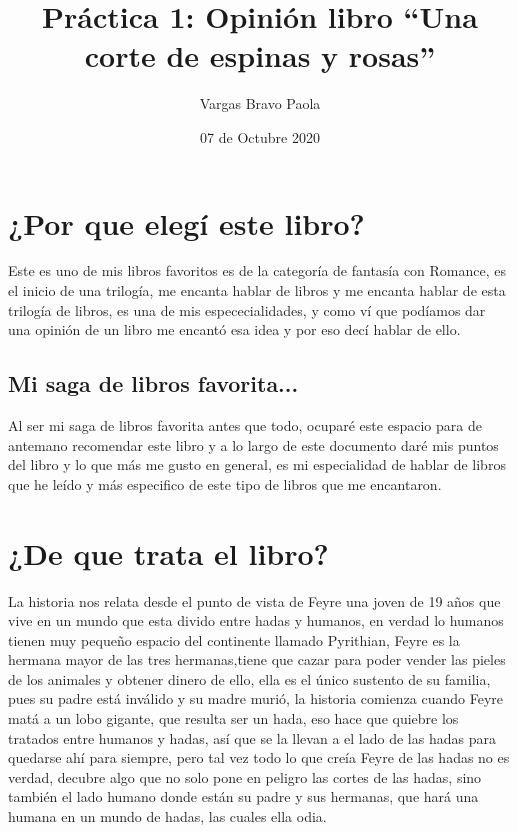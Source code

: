 \documentclass[12pt]{report}
\begin{document}
\title{Práctica 1: Opinión libro ``Una corte de espinas y rosas''}
\author{Vargas Bravo Paola}
\date{07 de Octubre 2020} 

\maketitle

\section*{¿Por que elegí este libro?}
Este es uno de mis libros favoritos es de la categoría de fantasía con Romance, es el inicio de una trilogía, me encanta hablar
de libros y me encanta hablar de esta trilogía de libros, es  una de mis espececialidades, y como ví que podíamos dar una opinión
de un libro me encantó esa idea y por eso decí hablar de ello.

\subsection*{Mi saga de libros favorita...}
Al ser mi saga de libros favorita antes que todo, ocuparé este espacio para de antemano recomendar este libro y a lo largo de este
documento daré mis puntos del libro y lo que más me gusto en general, es mi especialidad de hablar de libros que he leído y más especifico de este tipo de
libros que me encantaron.

\section*{¿De que trata el libro?}
La historia nos relata desde el punto de vista de Feyre una joven de 19 años que vive en un mundo que  esta divido
entre hadas y humanos, en verdad lo humanos tienen muy pequeño espacio del continente llamado Pyrithian, Feyre es la hermana mayor
de las tres hermanas,tiene que cazar para poder vender las pieles de los animales y obtener dinero de ello, ella es el único sustento de su familia, pues
su padre está inválido y su madre murió, la historia comienza cuando Feyre matá a un lobo gigante, que resulta ser un hada, eso hace que quiebre
los tratados entre humanos y hadas, así que se la llevan a el lado de las hadas para quedarse ahí para siempre, pero tal vez todo lo que
creía Feyre de las hadas no es verdad, decubre algo que no solo pone en peligro las cortes de las hadas, sino también el lado humano donde
están su padre y sus hermanas, que hará una humana en un mundo de hadas, las cuales ella odia.
 
\end{document}
